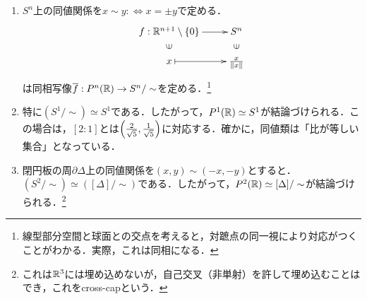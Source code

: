 \documentclass[uplatex,dvipdfmx]{jsreport}
\begin{document}
\begin{example}[球面の同値類としての射影空間]\mbox{}
    \begin{enumerate}
        \item $S^n$上の同値関係を$x\sim y:\Leftrightarrow x=\pm y$で定める．
        \[\xymatrix@R-2pc{
            f:\R^{n+1}\setminus\{0\}\ar[r]&S^n\\
            \rotatebox[origin=c]{90}{$\in$}&\rotatebox[origin=c]{90}{$\in$}\\
            x\ar@{|->}[r]&\frac{x}{\norm{x}}
        }\]
        は同相写像$\overline{f}:P^n(\mathbb{R})\to S^n/\sim$を定める．\footnote{線型部分空間と球面との交点を考えると，対蹠点の同一視により対応がつくことがわかる．実際，これは同相になる．}
        \item 特に$(S^1/\sim)\simeq S^1$である．したがって，$P^1(\mathbb{R})\simeq S^1$が結論づけられる．この場合は，$[2:1]$とは$\left(\frac{2}{\sqrt{5}},\frac{1}{\sqrt{5}}\right)$に対応する．確かに，同値類は「比が等しい集合」となっている．
        \item 閉円板の周$\partial\Delta$上の同値関係を$(x,y)\sim(-x,-y)$とすると．$(S^2/\sim)\simeq([\Delta]/\sim)$である．したがって，$P^2(\mathbb{R})\simeq[\Delta]/\sim$が結論づけられる．\footnote{これは$\mathbb{R}^3$には埋め込めないが，自己交叉（非単射）を許して埋め込むことはでき，これをcross-capという．}
    \end{enumerate}
\end{example}
\end{document}
